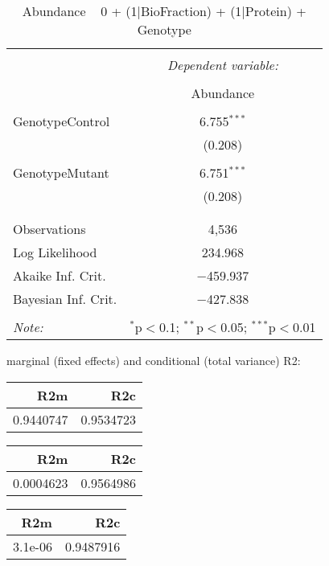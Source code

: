 \documentclass[11pt]{report}
\begin{document}
\begin{table}[!htbp] \centering 
  \caption{Abundance ~ 0 + (1|BioFraction) + (1|Protein) + Genotype} 
  \label{} 
\begin{tabular}{@{\extracolsep{5pt}}lc} 
\\[-1.8ex]\hline 
\hline \\[-1.8ex] 
 & \multicolumn{1}{c}{\textit{Dependent variable:}} \\ 
\cline{2-2} 
\\[-1.8ex] & Abundance \\ 
\hline \\[-1.8ex] 
 GenotypeControl & 6.755$^{***}$ \\ 
  & (0.208) \\ 
  & \\ 
 GenotypeMutant & 6.751$^{***}$ \\ 
  & (0.208) \\ 
  & \\ 
\hline \\[-1.8ex] 
Observations & 4,536 \\ 
Log Likelihood & 234.968 \\ 
Akaike Inf. Crit. & $-$459.937 \\ 
Bayesian Inf. Crit. & $-$427.838 \\ 
\hline 
\hline \\[-1.8ex] 
\textit{Note:}  & \multicolumn{1}{r}{$^{*}$p$<$0.1; $^{**}$p$<$0.05; $^{***}$p$<$0.01} \\ 
\end{tabular} 
\end{table} 
marginal (fixed effects) and conditional (total variance) R2:

\begin{tabular}{r|r}
\hline
R2m & R2c\\
\hline
0.9440747 & 0.9534723\\
\hline
\end{tabular}

\begin{tabular}{r|r}
\hline
R2m & R2c\\
\hline
0.0004623 & 0.9564986\\
\hline
\end{tabular}

\begin{tabular}{r|r}
\hline
R2m & R2c\\
\hline
3.1e-06 & 0.9487916\\
\hline
\end{tabular}
\end{document}
